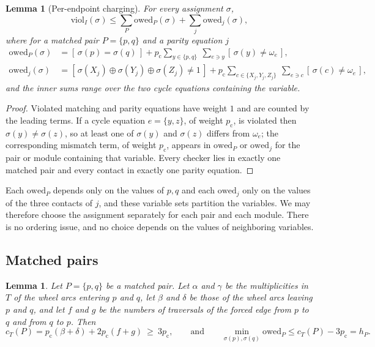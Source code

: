 \documentclass[11pt]{amsart}
\newtheorem{lemma}[theorem]{Lemma}
\theoremstyle{definition}
\theoremstyle{remark}
\numberwithin{equation}{section}
\newcommand{\iv}[1]{[\,#1\,]}
\newcommand{\owed}{\mathrm{owed}}
\newcommand{\viol}{\mathrm{viol}}
\newcommand{\pc}{p_{\mathrm{c}}}
\begin{document}
\begin{lemma}[Per-endpoint charging]\label{lem:charging}
For every assignment $\sigma$,
\[
\viol_I(\sigma)\le\sum_P\owed_P(\sigma)+\sum_j\owed_j(\sigma),
\]
where for a matched pair $P=\{p,q\}$ and a parity equation $j$
\begin{align*}
\owed_P(\sigma)&=\iv{\sigma(p)=\sigma(q)}+\pc\sum_{y\in\{p,q\}}\ \sum_{e\ni y}\iv{\sigma(y)\ne\omega_e},\\
\owed_j(\sigma)&=\iv{\sigma(X_j)\oplus\sigma(Y_j)\oplus\sigma(Z_j)\ne1}+\pc\sum_{c\in\{X_j,Y_j,Z_j\}}\ \sum_{e\ni c}\iv{\sigma(c)\ne\omega_e},
\end{align*}
and the inner sums range over the two cycle equations containing the variable.
\end{lemma}

\begin{proof}
Violated matching and parity equations have weight $1$ and are counted by the leading terms. If a cycle equation $e=\{y,z\}$, of weight $\pc$, is violated then $\sigma(y)\ne\sigma(z)$, so at least one of $\sigma(y)$ and $\sigma(z)$ differs from $\omega_e$; the corresponding mismatch term, of weight $\pc$, appears in $\owed_P$ or $\owed_j$ for the pair or module containing that variable. Every checker lies in exactly one matched pair and every contact in exactly one parity equation.
\end{proof}

Each $\owed_P$ depends only on the values of $p,q$ and each $\owed_j$ only on the values of the three contacts of $j$, and these variable sets partition the variables. We may therefore choose the assignment separately for each pair and each module. There is no ordering issue, and no choice depends on the values of neighboring variables.

\subsection{Matched pairs}

\begin{lemma}\label{lem:pair}
Let $P=\{p,q\}$ be a matched pair. Let $\alpha$ and $\gamma$ be the multiplicities in $T$ of the wheel arcs entering $p$ and $q$, let $\beta$ and $\delta$ be those of the wheel arcs leaving $p$ and $q$, and let $f$ and $g$ be the numbers of traversals of the forced edge from $p$ to $q$ and from $q$ to $p$. Then
\[
c_T(P)=\pc(\beta+\delta)+2\pc(f+g)\ \ge\ 3\pc,\qquad\text{and}\qquad \min_{\sigma(p),\sigma(q)}\owed_P\le c_T(P)-3\pc=h_P .
\]
\end{lemma}
\end{document}
